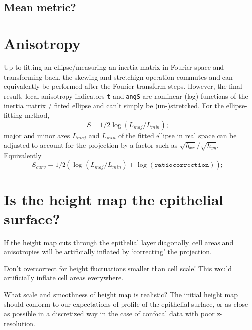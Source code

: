 \documentclass[10pt,a4paper]{article}
\begin{document}
\subsection{Mean metric?}
\section{Anisotropy}
Up to fitting an ellipse/measuring an inertia matrix in Fourier space and transforming back, the skewing and stretchign operation commutes and can equivalently be performed after the Fourier transform steps.  However, the final result, local anisotropy indicators \texttt{t} and \texttt{angS} are nonlinear (log) functions of the inertia matrix / fitted ellipse and can't simply be (un-)stretched.  For the ellipse-fitting method, 
\begin{equation}
S = 1/2 \log(L_{maj}/L_{min});
\end{equation}
major and minor axes $L_{maj}$ and $L_{min}$ of the fitted ellipse in real space can be adjusted to account for the projection by a factor such as $\sqrt{h_{xx}}/\sqrt{h_{yy}}$.  Equivalently 
\begin{equation}
S_{curv} = 1/2 \left( \log(L_{maj}/L_{min}) + \log(\mathtt{ratiocorrection}) \right);
\end{equation}
\section{Is the height map the epithelial surface?}
If the height map cuts through the epithelial layer diagonally, cell areas and anisotropies will be artificially inflated by `correcting' the projection.

Don't overcorrect for height fluctuations smaller than cell scale!  This would artificially inflate cell areas everywhere.

What scale and smoothness of height map is realistic?  The initial height map should conform to our expectations of profile of the epithelial surface, or as close as possible in a discretized way in the case of confocal data with poor z-resolution.
\end{document}
